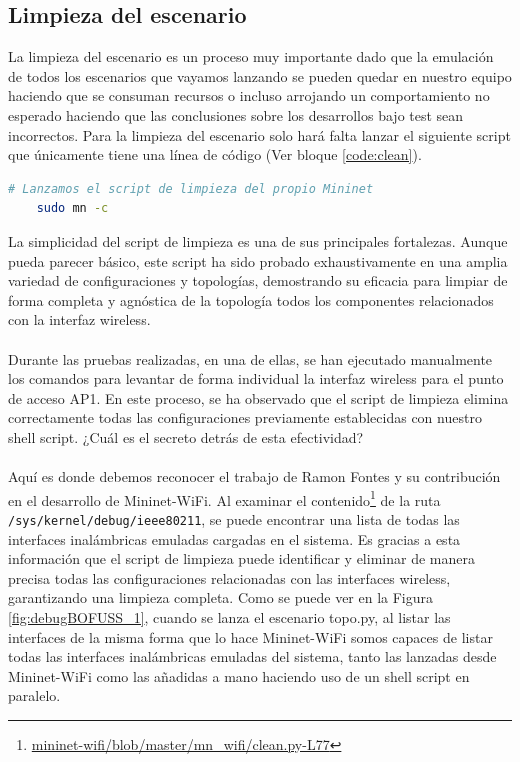 \newpage

\subsection{Limpieza del escenario}

La limpieza del escenario es un proceso muy importante dado que la emulación de todos los escenarios que vayamos lanzando se pueden quedar en nuestro equipo haciendo que se consuman recursos o incluso arrojando un comportamiento no esperado haciendo que las conclusiones sobre los desarrollos bajo test sean incorrectos. Para la limpieza del escenario solo hará falta lanzar el siguiente script que únicamente tiene una línea de código (Ver bloque \ref{code:clean}).\\

\begin{lstlisting}[language= bash, style=Consola, caption={Script de limpieza del escenario - clean.sh},label=code:clean]
    # Lanzamos el script de limpieza del propio Mininet
    sudo mn -c
\end{lstlisting}
\vspace{0.5cm}


La simplicidad del script de limpieza es una de sus principales fortalezas. Aunque pueda parecer básico, este script ha sido probado exhaustivamente en una amplia variedad de configuraciones y topologías, demostrando su eficacia para limpiar de forma completa y agnóstica de la topología todos los componentes relacionados con la interfaz wireless.\\
\\
Durante las pruebas realizadas, en una de ellas, se han ejecutado manualmente los comandos para levantar de forma individual la interfaz wireless para el punto de acceso AP1. En este proceso, se ha observado que el script de limpieza elimina correctamente todas las configuraciones previamente establecidas con nuestro shell script. ¿Cuál es el secreto detrás de esta efectividad?\\
\\
Aquí es donde debemos reconocer el trabajo de Ramon Fontes y su contribución en el desarrollo de Mininet-WiFi. Al examinar el contenido\footnote{\href{https://github.com/intrig-unicamp/mininet-wifi/blob/master/mn_wifi/clean.py\#L77}{mininet-wifi/blob/master/mn\_wifi/clean.py-L77}} de la ruta \texttt{/sys/kernel/debug/ieee80211}, se puede encontrar una lista de todas las interfaces inalámbricas emuladas cargadas en el sistema. Es gracias a esta información que el script de limpieza puede identificar y eliminar de manera precisa todas las configuraciones relacionadas con las interfaces wireless, garantizando una limpieza completa. Como se puede ver en la Figura \ref{fig:debugBOFUSS_1}, cuando se lanza el escenario topo.py, al listar las interfaces de la misma forma que lo hace Mininet-WiFi somos capaces de listar todas las interfaces inalámbricas emuladas del sistema, tanto las lanzadas desde Mininet-WiFi como las añadidas a mano haciendo uso de un shell script en paralelo.

